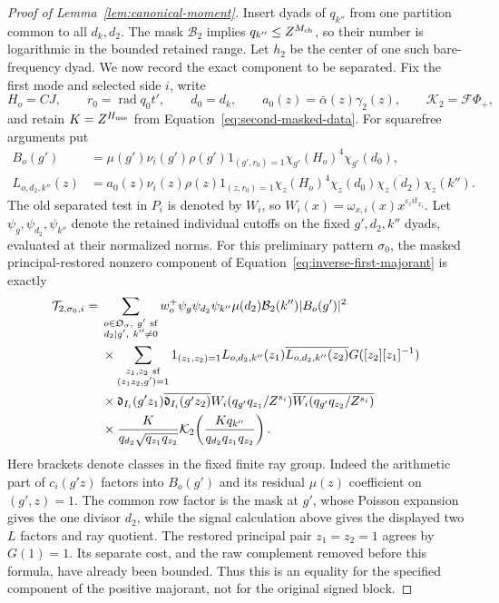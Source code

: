 \documentclass[11pt,a4paper]{article}
\numberwithin{equation}{section}
\numberwithin{figure}{section}
\theoremstyle{definition}
\theoremstyle{remark}
\begin{document}
\begin{proof}[Proof of Lemma~\ref{lem:canonical-moment}]
Insert dyads of \(q_{k''}\) from one partition common to all \(d_k,d_2\).
The mask \(\mathcal B_2\) implies \(q_{k''}\le Z^{M_{\rm ch}}\), so their
number is logarithmic in the bounded retained range.  Let \(h_2\) be
the center of one such bare-frequency dyad.  We now record the exact
component to be separated.  Fix the first mode and selected side \(i\),
write
\[
 H_o=CJ,\qquad r_0=\operatorname{rad}q_0t',\qquad d_0=d_k,
 \qquad a_0(z)=\bar\alpha(z)\gamma_2(z),\qquad
 \mathcal K_2=\mathcal F\Phi_+,
\]
and retain \(K=Z^{H_{\rm use}}\) from
Equation~\eqref{eq:second-masked-data}.  For squarefree arguments put
\begin{equation}\label{eq:inverse-second-outer-coefficients}
 \begin{split}
 B_o(g')&=\mu(g')\nu_i(g')\rho(g')1_{(g',r_0)=1}
              \chi_{g'}(H_o)^4\chi_{g'}(d_0),\\
 L_{o,d_2,k''}(z)&=a_0(z)\nu_i(z)\rho(z)1_{(z,r_0)=1}
       \chi_z(H_o)^4\chi_z(d_0)\overline{\chi_z(d_2)}\chi_z(k'').
 \end{split}
\end{equation}
The old separated test in \(P_i\) is denoted by \(W_i\), so
\(W_i(x)=\omega_{x,i}(x)x^{\varepsilon_iit_{x_i}}\).
Let \(\psi_g,\psi_{d_2},\psi_{k''}\) denote the retained individual
cutoffs on the fixed \(g',d_2,k''\) dyads, evaluated at their normalized
norms.  For this preliminary pattern \(\sigma_0\), the masked
principal-restored nonzero component of
Equation~\eqref{eq:inverse-first-majorant} is exactly
\begin{equation}\label{eq:inverse-second-formal-component}
 \begin{split}
 \mathcal T_{2,\sigma_0,i}={}&
 \sum_{\substack{o\in\mathfrak O_\sigma,\ g'\ {\rm sf}\\d_2\mid g',\ k''\ne0}}
 w_o^+\psi_g\psi_{d_2}\psi_{k''}\mu(d_2)\mathcal B_2(k'')|B_o(g')|^2\\
 &\times\sum_{\substack{z_1,z_2\ {\rm sf}\\(z_1z_2,g')=1}}
 1_{(z_1,z_2)=1}L_{o,d_2,k''}(z_1)\overline{L_{o,d_2,k''}(z_2)}
       G([z_2][z_1]^{-1})\\
 &\times\mathfrak d_{I_i}(g'z_1)\overline{\mathfrak d_{I_i}(g'z_2)}
       W_i(q_{g'}q_{z_1}/Z^{s_i})
       \overline{W_i(q_{g'}q_{z_2}/Z^{s_i})}\\
 &\times\frac{K}{q_{d_2}\sqrt{q_{z_1}q_{z_2}}}
       \mathcal K_2\!\left(\frac{Kq_{k''}}{q_{d_2}q_{z_1}q_{z_2}}\right).
 \end{split}
\end{equation}
Here brackets denote classes in the fixed finite ray group.  Indeed the
arithmetic part of \(c_i(g'z)\) factors into \(B_o(g')\) and its
residual \(\mu(z)\) coefficient on \((g',z)=1\).  The common row factor
is the mask at \(g'\), whose Poisson expansion gives the one divisor
\(d_2\), while the signal calculation above gives the displayed two
\(L\) factors and ray quotient.  The restored principal pair
\(z_1=z_2=1\) agrees by \(G(1)=1\).  Its separate cost, and the raw
complement removed before this formula, have already been bounded.
Thus this is an equality for the specified component of the positive
majorant, not for the original signed block.


\end{proof}
\end{document}
